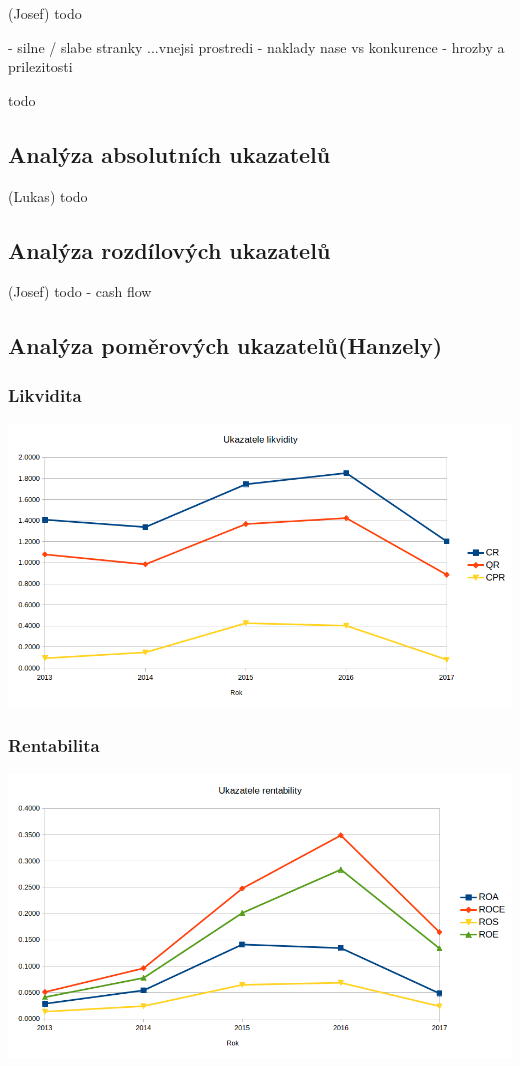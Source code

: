 \documentclass[12pt]{article}%
\begin{document}
 (Josef)
todo

- silne / slabe stranky ...vnejsi prostredi
- naklady nase vs konkurence
- hrozby a prilezitosti

todo

\subsection{Analýza absolutních ukazatelů} (Lukas)
todo

\subsection{Analýza rozdílových ukazatelů} (Josef)
todo
- cash flow


\subsection{Analýza poměrových ukazatelů(Hanzely)}
\subsubsection*{Likvidita}
\includegraphics[scale=0.6]{obr/ukazatele_likvidity.png}
\subsubsection*{Rentabilita}
\includegraphics[scale=0.6]{obr/ukazatele_rentability.png}
\end{document}

